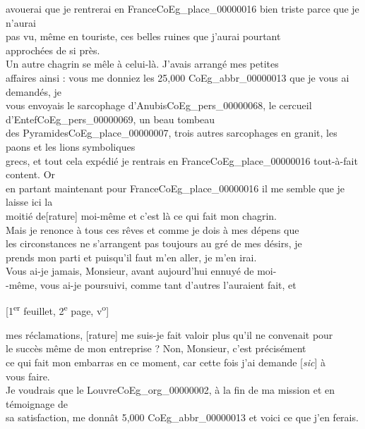\documentclass{book}
\begin{document}
avouerai que je rentrerai en France\gls{CoEg_place_00000016} bien triste parce que je n’aurai\\
pas vu, même en touriste, ces belles ruines que j’aurai pourtant\\
approchées de si près.\\
\indent Un autre chagrin se mêle à celui-là. J’avais arrangé mes petites\\
affaires ainsi : vous me donniez les 25,000 \gls{CoEg_abbr_00000013} que je vous ai demandés, je\\
vous envoyais le sarcophage d’Anubis\gls{CoEg_pers_00000068}, le cercueil d’Entef\gls{CoEg_pers_00000069}, un beau tombeau\\
des Pyramides\gls{CoEg_place_00000007}, trois autres sarcophages en granit, les paons et les lions symboliques\\
grecs, et tout cela expédié je rentrais en France\gls{CoEg_place_00000016} tout-à-fait content. Or\\
en partant maintenant pour France\gls{CoEg_place_00000016} il me semble que je laisse ici la\\
moitié de[rature] moi-même et c’est là ce qui fait mon chagrin.\\
\indent Mais je renonce à tous ces rêves et comme je dois à mes dépens que\\
les circonstances ne s’arrangent pas toujours au gré de mes désirs, je\\
prends mon parti et puisqu’il faut m’en aller, je m’en irai.\\
\indent Vous ai-je jamais, Monsieur, avant aujourd’hui ennuyé de moi-\\
-même, vous ai-je poursuivi, comme tant d’autres l’auraient fait, et
{\footnotesize\begin{center} {[1\textsuperscript{er} feuillet, 2\textsuperscript{e} page, v\textsuperscript{o}]}\end{center}}
\noindent mes réclamations, [rature] me suis-je fait valoir plus qu’il ne convenait pour\\
le succès même de mon entreprise ? Non, Monsieur, c’est précisément\\
ce qui fait mon embarras en ce moment, car cette fois j’ai demande {[\textit{sic}]} à\\
vous faire.\\
\indent Je voudrais que le Louvre\gls{CoEg_org_00000002}, à la fin de ma mission et en témoignage de\\
sa satisfaction, me donnât 5,000 \gls{CoEg_abbr_00000013} et voici ce que j’en ferais.\\
\end{document}
